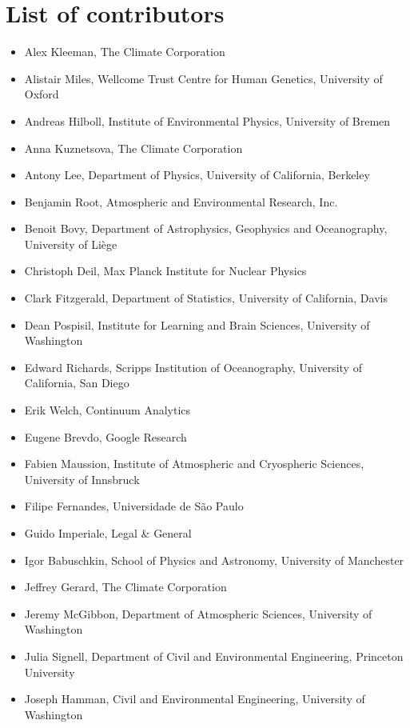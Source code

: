\documentclass{jors}
\begin{document}
\section*{List of contributors}

\begin{itemize}
\item Alex Kleeman, The Climate Corporation
\item Alistair Miles, Wellcome Trust Centre for Human Genetics, University of Oxford
\item Andreas Hilboll, Institute of Environmental Physics, University of Bremen
\item Anna Kuznetsova, The Climate Corporation
\item Antony Lee, Department of Physics, University of California, Berkeley
\item Benjamin Root, Atmospheric and Environmental Research, Inc.
\item Benoit Bovy, Department of Astrophysics, Geophysics and Oceanography, University of Liège
\item Christoph Deil, Max Planck Institute for Nuclear Physics
\item Clark Fitzgerald, Department of Statistics, University of California, Davis
\item Dean Pospisil, Institute for Learning and Brain Sciences, University of Washington
\item Edward Richards, Scripps Institution of Oceanography, University of California, San Diego
\item Erik Welch, Continuum Analytics
\item Eugene Brevdo, Google Research
\item Fabien Maussion, Institute of Atmospheric and Cryospheric Sciences, University of Innsbruck
\item Filipe Fernandes, Universidade de São Paulo
\item Guido Imperiale, Legal & General
\item Igor Babuschkin, School of Physics and Astronomy, University of Manchester
\item Jeffrey Gerard, The Climate Corporation
\item Jeremy McGibbon, Department of Atmospheric Sciences, University of Washington
\item Julia Signell, Department of Civil and Environmental Engineering, Princeton University
\item Joseph Hamman, Civil and Environmental Engineering, University of Washington

\end{itemize}
\end{document}
